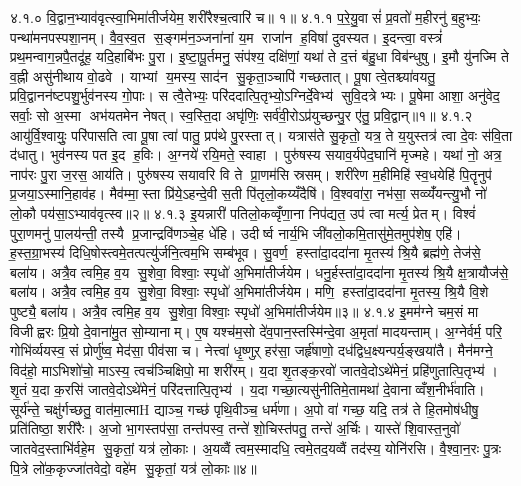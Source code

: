 ४.१.०
वि॒द्वान॒भ्याव॑वृत्स्वा॒भिमा॑तीर्जयेम॒ शरी॑रैश्च॒त्वारि॑ च॥ १॥
४.१.१
प॒रे॒यु॒वासं॑ प्र॒वतो॑ म॒हीरनु॑ ब॒हुभ्यः॒ पन्था॑मनपस्पशा॒नम्। वै॒व॒स्व॒त स॒ङ्गम॑न॒ञ्जना॑नां य॒म राजा॑न ह॒विषा॑ दुवस्यत। इ॒दन्त्वा॒ वस्त्रं॑ प्रथ॒मन्वाग॒न्नपै॒तदू॑ह॒ यदि॒हाबि॑भः पु॒रा। इ॒ष्टा॒पू॒र्तमनु॒ संप॑श्य॒ दक्षि॑णां॒ यथा॑ ते द॒त्तं ब॑हु॒धा विब॑न्धुषु। इ॒मौ यु॑नज्मि ते व॒ह्नी असु॑नीथाय वो॒ढवे। याभ्यां य॒मस्य॒ साद॑न सु॒कृता॒ञ्चापि॑ गच्छतात्। पू॒षा त्वे॒तश्च्या॑वयतु॒ प्रवि॒द्वानन॑ष्टपशु॒र्भुव॑नस्य गो॒पाः। स त्वै॒तेभ्यः॒ परि॑ददात्पि॒तृभ्यो॒ऽग्निर्दे॒वेभ्य॑ सुवि॒दत्रेभ्यः। पू॒षेमा आशा॒ अनु॑वेद॒ सर्वाः॒ सो अ॒स्मा अभ॑यतमेन नेषत्। स्व॒स्ति॒दा अघृ॑णिः॒ सर्व॑वी॒रोऽप्र॑युच्छन्पु॒र ए॑तु॒ प्रवि॒द्वान्॥१॥
४.१.२
आयु॑र्वि॒श्वायुः॒ परि॑पासति त्वा पू॒षा त्वा॑ पातु॒ प्रप॑थे पु॒रस्तात्। यत्रास॑ते सु॒कृतो॒ यत्र॒ ते य॒युस्तत्र॑ त्वा दे॒वः स॑वि॒ता द॑धातु। भुव॑नस्य पत इ॒द ह॒विः। अ॒ग्नये॑ रयि॒मते॒ स्वाहा। पुरु॑षस्य सयाव॒र्यपेद॒घानि॑ मृज्महे। यथा॑ नो॒ अत्र॒ नाप॑रः पु॒रा ज॒रस॒ आय॑ति। पुरु॑षस्य सयावरि वि ते प्रा॒णम॑सि स्रसम्। शरी॑रेण म॒हीमिहि॑ स्व॒धयेहि॑ पि॒तॄनुप॑ प्र॒जया॒ऽस्मानि॒हाव॑ह। मैव॑म्मा॒स्ता प्रि॑ये॒ऽहन्दे॒वी स॒ती पि॑तृलो॒कय्यँदैषि॑। वि॒श्ववा॑रा॒ नभ॑सा॒ सव्व्यँ॑यन्त्यु॒भौ नो॑ लो॒कौ पय॑सा॒ऽभ्याव॑वृत्स्व॥२॥
४.१.३
इ॒यन्नारी॑ पतिलो॒कव्वृँणा॒ना निप॑द्यत॒ उप॑ त्वा मर्त्य॒ प्रेतम्। विश्वं॑ पुरा॒णमनु॑ पा॒लय॑न्ती॒ तस्यै प्र॒जान्द्रवि॑णञ्चे॒ह धे॑हि। उदीर्ष्व नार्य॒भि जी॑वलो॒कमि॒तासु॑मे॒तमुप॑शेष॒ एहि॑। ह॒स्त॒ग्रा॒भस्य॑ दिधि॒षोस्त्वमे॒तत्पत्यु॑र्जनि॒त्वम॒भि सम्ब॑भूव। सु॒वर्ण॒ हस्ता॑दा॒ददा॑ना मृ॒तस्य॑ श्रि॒यै ब्रह्म॑णे॒ तेज॑से॒ बला॑य। अत्रै॒व त्वमि॒ह व॒य सु॒शेवा॒ विश्वाः॒ स्पृधो॑ अ॒भिमा॑तीर्जयेम। धनु॒र्\mbox{}हस्ता॑दा॒ददा॑ना मृ॒तस्य॑ श्रि॒यै क्ष॒त्रायौज॑से॒ बला॑य। अत्रै॒व त्वमि॒ह व॒य सु॒शेवा॒ विश्वाः॒ स्पृधो॑ अ॒भिमा॑तीर्जयेम। मणि॒ हस्ता॑दा॒ददा॑ना मृ॒तस्य॒ श्रि॒यै वि॒शे पुष्ट्यै॒ बला॑य। अत्रै॒व त्वमि॒ह व॒य सु॒शेवा॒ विश्वाः॒ स्पृधो॑ अ॒भिमा॑तीर्जयेम॥३॥
४.१.४
इ॒मम॑ग्ने चम॒सं मा विजीह्वरः प्रि॒यो दे॒वाना॑मु॒त सो॒म्यानाम्। ए॒ष यश्च॑म॒सो दे॑व॒पान॒स्तस्मि॑न्दे॒वा अ॒मृता॑ मादयन्ताम्। अ॒ग्नेर्वर्म॒ परि॒ गोभि॑र्व्ययस्व॒ सं प्रोर्णु॑ष्व॒ मेद॑सा॒ पीव॑सा च। नेत्त्वा॑ धृ॒ष्णुऱ् हर॑सा॒ जर्\mbox{}हृ॑षाणो॒ दध॑द्विध॒क्ष्यन्पर्य॒ङ्खया॑तै। मैन॑मग्ने॒ विद॑हो॒ माऽभिशो॑चो॒ माऽस्य॒ त्वच॑ञ्चिक्षिपो॒ मा शरी॑रम्। य॒दा शृ॒तङ्क॒रवो॑ जातवे॒दोऽथे॑मेनं॒ प्रहि॑णुतात्पि॒तृभ्य॑। शृ॒तं य॒दा क॒रसि॑ जातवे॒दोऽथे॑मेनं॒ परि॑दत्तात्पि॒तृभ्य॑। य॒दा गच्छा॒त्यसु॑नीतिमे॒तामथा॑ दे॒वानाव्वँश॒नीर्भ॑वाति। सूर्य॑न्ते॒ चक्षु॑र्गच्छतु॒ वात॑मा॒त्माH द्याञ्च॒ गच्छ॑ पृथि॒वीञ्च॒ धर्म॑णा। अ॒पो वा॑ गच्छ॒ यदि॒ तत्र॑ ते हि॒तमोष॑धीषु॒ प्रति॑तिष्ठा॒ शरी॑रैः। अ॒जो भा॒गस्तप॑सा॒ तन्त॑पस्व॒ तन्ते॑ शो॒चिस्त॑पतु॒ तन्ते॑ अ॒र्चिः। यास्ते॑ शि॒वास्त॒नुवो॑ जातवेद॒स्ताभि॑र्वहे॒म सु॒कृतां॒ यत्र॑ लो॒काः। अ॒यव्वैं त्वम॒स्मादधि॒ त्वमे॒तद॒यव्वैं तद॑स्य॒ योनि॑रसि। वै॒श्वा॒न॒रः पु॒त्रः पि॒त्रे लो॑क॒कृज्जा॑तवेदो॒ वहे॑म सु॒कृतां॒ यत्र॑ लो॒काः॥४॥
\anuvakamend

